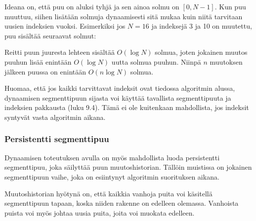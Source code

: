 Ideana on, että puu on aluksi tyhjä
ja sen ainoa solmu on $[0,N-1]$.
Kun puu muuttuu, siihen lisätään
solmuja dynaamisesti sitä mukaa kuin niitä tarvitaan
uusien indeksien vuoksi.
Esimerkiksi jos $N=16$ ja indeksejä
3 ja 10 on muutettu,
puu sisältää seuraavat solmut:
\begin{center}
\end{center}

Reitti puun juuresta lehteen sisältää
$O(\log N)$ solmua,
joten jokainen muutos puuhun lisää
enintään $O(\log N)$ uutta solmua puuhun.
Niinpä $n$ muutoksen jälkeen puussa
on enintään $O(n \log N)$ solmua.

Huomaa, että jos kaikki tarvittavat indeksit
ovat tiedossa
algoritmin alussa, dynaamisen segmenttipuun
sijasta voi käyttää tavallista segmenttipuuta
ja indeksien pakkausta (luku 9.4).
Tämä ei ole kuitenkaan mahdollista,
jos indeksit syntyvät vasta algoritmin aikana.

\subsubsection{Persistentti segmenttipuu}

Dynaamisen toteutuksen avulla on myös
mahdollista luoda persistentti segmenttipuu,
joka säilyttää puun muutoshistorian.
Tällöin muistissa on jokainen
segmenttipuun vaihe, joka on esiintynyt
algoritmin suorituksen aikana.

Muutoshistorian hyötynä on,
että kaikkia vanhoja puita voi käsitellä
segmenttipuun tapaan,
koska niiden rakenne on edelleen olemassa.
Vanhoista puista voi myös johtaa uusia
puita, joita voi muokata edelleen.

